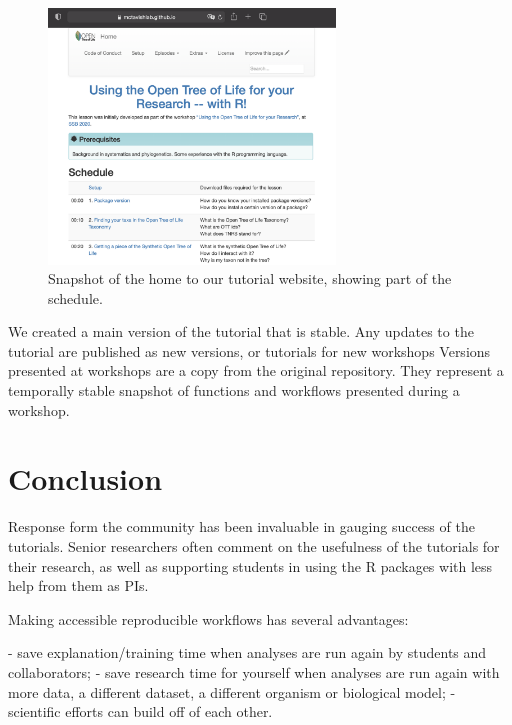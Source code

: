 \documentclass[12pt]{article}
\begin{document}
\begin{figure}
\begin{center}
\includegraphics[width=3in]{fig-schedule.png}
\end{center}
\caption{Snapshot of the home to our tutorial website, showing part of the schedule. \label{fig:schedule}}
\end{figure}

We created a main version of the tutorial that is stable. Any updates to the tutorial are
published as new versions, or tutorials for new workshops \citep{CARPENTRIES}
 Versions presented at workshops are a copy from the original repository.
They represent a temporally stable snapshot of functions and workflows presented
during a workshop.


\section*{Conclusion}
\label{sec:conclusion}

Response form the community has been invaluable in gauging success of the tutorials.
Senior researchers often comment on the usefulness
of the tutorials for their research, as well as supporting students in using the
R packages with less help from them as PIs.

Making accessible reproducible workflows has several advantages:

- save explanation/training time when analyses are run again by students and collaborators;
- save research time for yourself when analyses are run again with more data, a
  different dataset, a different organism or biological model;
- scientific efforts can build off of each other.
\end{document}
